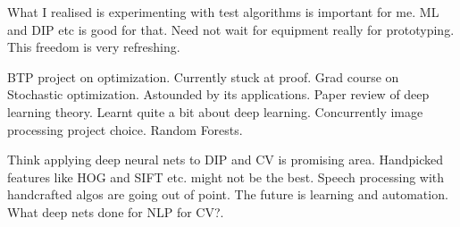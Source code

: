 \documentclass[a4paper]{article}
\begin{document}
What I realised is experimenting with test algorithms is important for me. ML and DIP etc is good for that. Need not wait for equipment really for prototyping. This freedom is very refreshing.


BTP project on optimization. Currently stuck at proof.
Grad course on Stochastic optimization. Astounded by its applications. 
Paper review of deep learning theory. Learnt quite a bit about deep learning.
Concurrently image processing project choice. Random Forests.

Think applying deep neural nets to DIP and CV is promising area.
Handpicked features like HOG and SIFT etc. might not be the best.
Speech processing with handcrafted algos are going out of point.
The future is learning and automation.
What deep nets done for NLP for CV?.
\end{document}
